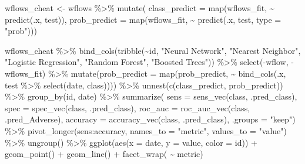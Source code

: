 \documentclass[
]{article}
\newenvironment{Shaded}{\begin{snugshade}}{\end{snugshade}}
\newcommand{\AttributeTok}[1]{\textcolor[rgb]{0.77,0.63,0.00}{#1}}
\newcommand{\FunctionTok}[1]{\textcolor[rgb]{0.00,0.00,0.00}{#1}}
\newcommand{\NormalTok}[1]{#1}
\newcommand{\OtherTok}[1]{\textcolor[rgb]{0.56,0.35,0.01}{#1}}
\newcommand{\SpecialCharTok}[1]{\textcolor[rgb]{0.00,0.00,0.00}{#1}}
\newcommand{\StringTok}[1]{\textcolor[rgb]{0.31,0.60,0.02}{#1}}
\begin{document}
\begin{Shaded}
\begin{Highlighting}[]
\NormalTok{wflows\_cheat }\OtherTok{\textless{}{-}}
\NormalTok{  wflows }\SpecialCharTok{\%\textgreater{}\%}
  \FunctionTok{mutate}\NormalTok{(}
    \AttributeTok{class\_predict =} \FunctionTok{map}\NormalTok{(wflows\_fit, }\SpecialCharTok{\textasciitilde{}} \FunctionTok{predict}\NormalTok{(.x, test)),  }
    \AttributeTok{prob\_predict =} \FunctionTok{map}\NormalTok{(wflows\_fit, }\SpecialCharTok{\textasciitilde{}} \FunctionTok{predict}\NormalTok{(.x, test, }\AttributeTok{type =} \StringTok{"prob"}\NormalTok{)))}


\NormalTok{wflows\_cheat }\SpecialCharTok{\%\textgreater{}\%}
  \FunctionTok{bind\_cols}\NormalTok{(}\FunctionTok{tribble}\NormalTok{(}\SpecialCharTok{\textasciitilde{}}\NormalTok{id, }\StringTok{"Neural Network"}\NormalTok{, }\StringTok{"Nearest Neighbor"}\NormalTok{, }\StringTok{"Logistic Regression"}\NormalTok{, }
      \StringTok{"Random Forest"}\NormalTok{, }\StringTok{"Boosted Trees"}\NormalTok{)) }\SpecialCharTok{\%\textgreater{}\%}
  \FunctionTok{select}\NormalTok{(}\SpecialCharTok{{-}}\NormalTok{wflow, }\SpecialCharTok{{-}}\NormalTok{wflows\_fit) }\SpecialCharTok{\%\textgreater{}\%}
  \FunctionTok{mutate}\NormalTok{(}\AttributeTok{prob\_predict =} \FunctionTok{map}\NormalTok{(prob\_predict, }\SpecialCharTok{\textasciitilde{}} \FunctionTok{bind\_cols}\NormalTok{(.x, test }\SpecialCharTok{\%\textgreater{}\%} \FunctionTok{select}\NormalTok{(date, class)))) }\SpecialCharTok{\%\textgreater{}\%}
  \FunctionTok{unnest}\NormalTok{(}\FunctionTok{c}\NormalTok{(class\_predict, prob\_predict)) }\SpecialCharTok{\%\textgreater{}\%}
  \FunctionTok{group\_by}\NormalTok{(id, date) }\SpecialCharTok{\%\textgreater{}\%}
  \FunctionTok{summarize}\NormalTok{(}
            \AttributeTok{sens =} \FunctionTok{sens\_vec}\NormalTok{(class, .pred\_class),}
            \AttributeTok{spec =} \FunctionTok{spec\_vec}\NormalTok{(class, .pred\_class),}
            \AttributeTok{roc\_auc =} \FunctionTok{roc\_auc\_vec}\NormalTok{(class, .pred\_Adverse), }
            \AttributeTok{accuracy =} \FunctionTok{accuracy\_vec}\NormalTok{(class, .pred\_class), }\AttributeTok{.groups =} \StringTok{"keep"}\NormalTok{) }\SpecialCharTok{\%\textgreater{}\%}
  \FunctionTok{pivot\_longer}\NormalTok{(sens}\SpecialCharTok{:}\NormalTok{accuracy, }\AttributeTok{names\_to =} \StringTok{"metric"}\NormalTok{, }\AttributeTok{values\_to =} \StringTok{"value"}\NormalTok{) }\SpecialCharTok{\%\textgreater{}\%}
  \FunctionTok{ungroup}\NormalTok{() }\SpecialCharTok{\%\textgreater{}\%}
  \FunctionTok{ggplot}\NormalTok{(}\FunctionTok{aes}\NormalTok{(}\AttributeTok{x =}\NormalTok{ date, }\AttributeTok{y =}\NormalTok{ value, }\AttributeTok{color =}\NormalTok{ id)) }\SpecialCharTok{+}
  \FunctionTok{geom\_point}\NormalTok{() }\SpecialCharTok{+}
  \FunctionTok{geom\_line}\NormalTok{() }\SpecialCharTok{+}
  \FunctionTok{facet\_wrap}\NormalTok{( }\SpecialCharTok{\textasciitilde{}}\NormalTok{ metric)}
\end{Highlighting}
\end{Shaded}
\end{document}
